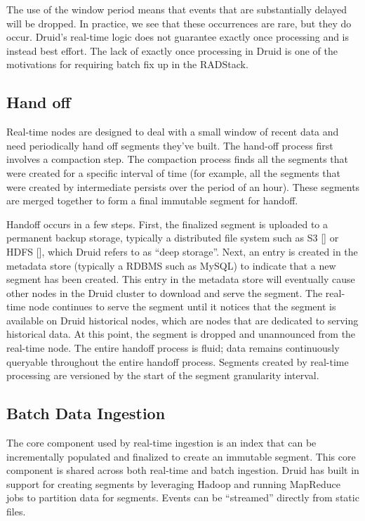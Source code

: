 \documentclass{vldb}
\begin{document}
The use of the window period means that events that are substantially delayed
will be dropped. In practice, we see that these occurrences are rare, but they
do occur. Druid’s real-time logic does not guarantee exactly once processing
and is instead best effort. The lack of exactly once processing in Druid is one
of the motivations for requiring batch fix up in the RADStack.

\subsection{Hand off}
Real-time nodes are designed to deal with a small window of recent data and
need periodically hand off segments they’ve built. The hand-off process first
involves a compaction step. The compaction process finds all the segments that
were created for a specific interval of time (for example, all the segments
that were created by intermediate persists over the period of an hour). These
segments are merged together to form a final immutable segment for handoff. 

Handoff occurs in a few steps. First, the finalized segment is uploaded to a
permanent backup storage, typically a distributed file system such as S3 [] or
HDFS [], which Druid refers to as “deep storage”. Next, an entry is created in
the metadata store (typically a RDBMS such as MySQL) to indicate that a new
segment has been created. This entry in the metadata store will eventually
cause other nodes in the Druid cluster to download and serve the segment. The
real-time node continues to serve the segment until it notices that the segment
is available on Druid historical nodes, which are nodes that are dedicated to
serving historical data. At this point, the segment is dropped and unannounced
from the real-time node. The entire handoff process is fluid; data remains
continuously queryable throughout the entire handoff process. Segments created
by real-time processing are versioned by the start of the segment granularity
interval.

\subsection{Batch Data Ingestion}
The core component used by real-time ingestion is an index that can be
incrementally populated and finalized to create an immutable segment. This core
component is shared across both real-time and batch ingestion. Druid has built
in support for creating segments by leveraging Hadoop and running MapReduce
jobs to partition data for segments.  Events can be “streamed” directly from
static files.
\end{document}
